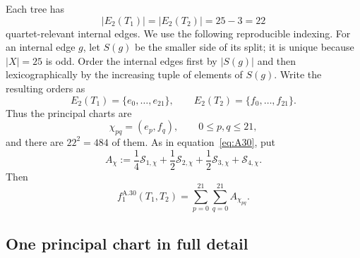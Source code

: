 Each tree has
\[
 |E_2(T_1)|=|E_2(T_2)|=25-3=22
\]
quartet-relevant internal edges.  We use the following reproducible indexing.
For an internal edge $g$, let $S(g)$ be the smaller side of its split; it is
unique because $|X|=25$ is odd.  Order the internal edges first by $|S(g)|$
and then lexicographically by the increasing tuple of elements of $S(g)$.
Write the resulting orders as
\[
 E_2(T_1)=\{e_0,\ldots,e_{21}\},
 \qquad
 E_2(T_2)=\{f_0,\ldots,f_{21}\}.
\]
Thus the principal charts are
\[
 \chi_{pq}=(e_p,f_q),
 \qquad 0\le p,q\le21,
\]
and there are $22^2=484$ of them.  As in equation~\eqref{eq:A30}, put
\[
 A_\chi:=
 \frac14\mathcal S_{1,\chi}
 +\frac12\mathcal S_{2,\chi}
 +\frac12\mathcal S_{3,\chi}
 +\mathcal S_{4,\chi}.
\]
Then
\[
 f_1^{\mathrm{A.30}}(T_1,T_2)
 =\sum_{p=0}^{21}\sum_{q=0}^{21}A_{\chi_{pq}}.
\]

\subsection{One principal chart in full detail}

